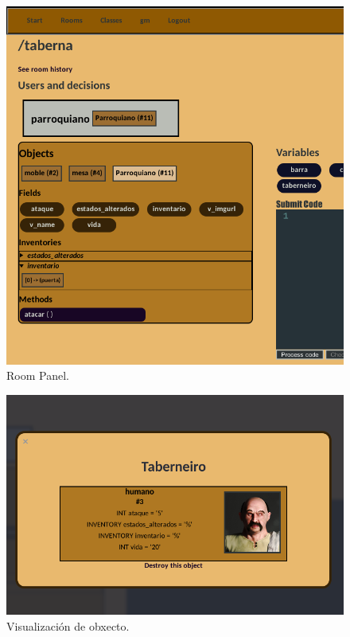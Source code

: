 \begin{figure}
\centerline{\includegraphics{figuras/demiurgo_roompanel.png}}
\caption{Room Panel.}
\label{fig:demiurgoroompanel}
\end{figure}


\begin{figure}
\centerline{\includegraphics{figuras/demiurgo_object.png}}
\caption{Visualización de obxecto.}
\label{fig:demiurgoobject}
\end{figure}

